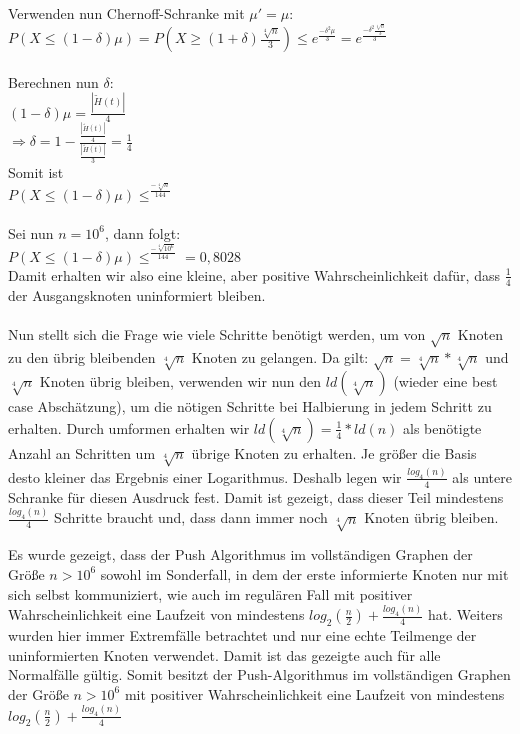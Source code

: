\documentclass[12pt,a4paper]{report}
\begin{document}
\begin{itemize}
	Verwenden nun Chernoff-Schranke mit $\mu' = \mu$:\\
	$P(X\le(1-\delta)\mu)=P(X\ge(1+\delta)\frac{\sqrt[4]{n}}{3})\le e^{\frac{-\delta^2 \mu}{3}}=e^{\frac{-\delta^2 \frac{\sqrt[4]{n}}{3}}{3}}$\\
	\\
	Berechnen nun $\delta$:\\
	$(1-\delta)\mu = \frac{|\tilde{H}(t)|}{4}$\\
	$\Rightarrow \delta =1-\frac{\frac{|\tilde{H}(t)|}{4}}{\frac{|\tilde{H}(t)|}{3}} = \frac{1}{4}$\\
	Somit ist\\
	$P(X\le(1-\delta)\mu)\le^{\frac{-\sqrt[4]{n}}{144}}$\\
	\\
	Sei nun $n=10^6$, dann folgt:\\
	$P(X\le(1-\delta)\mu)\le^{\frac{-\sqrt[4]{10^6}}{144}} = 0,8028$\\
	Damit erhalten wir also eine kleine, aber positive Wahrscheinlichkeit dafür, dass $\frac{1}{4}$ der Ausgangsknoten uninformiert bleiben. \\
	\\
	Nun stellt sich die Frage wie viele Schritte benötigt werden, um von $\sqrt{n}$ Knoten zu den übrig bleibenden
	$\sqrt[4]{n}$ Knoten zu gelangen.
	Da gilt: $\sqrt{n} = \sqrt[4]{n} * \sqrt[4]{n}$ und $\sqrt[4]{n}$ Knoten übrig bleiben, verwenden wir nun den $ld(\sqrt[4]{n})$ (wieder eine best case Abschätzung),
	um die nötigen Schritte bei Halbierung in jedem Schritt zu erhalten. Durch umformen erhalten wir $ld(\sqrt[4]{n}) = \frac{1}{4}*ld(n)$
	als benötigte Anzahl an Schritten um $\sqrt[4]{n}$ übrige Knoten zu erhalten. Je größer die Basis desto kleiner das Ergebnis einer Logarithmus.
	Deshalb legen wir $\frac{log_4(n)}{4}$ als untere Schranke für diesen Ausdruck fest. Damit ist gezeigt, dass dieser Teil mindestens $\frac{log_4(n)}{4}$ Schritte braucht und, dass dann immer noch $\sqrt[4]{n}$ Knoten übrig bleiben.


	\end{itemize}

Es wurde gezeigt, dass der Push Algorithmus im vollständigen Graphen der Größe $n > 10^6$ sowohl im Sonderfall, in dem der erste informierte Knoten nur mit sich selbst kommuniziert,
wie auch im regulären Fall mit positiver Wahrscheinlichkeit eine Laufzeit von mindestens $log_2(\frac{n}{2})+\frac{log_4(n)}{4}$ hat.
Weiters wurden hier immer Extremfälle betrachtet und nur eine echte Teilmenge der uninformierten Knoten verwendet.
Damit ist das gezeigte auch für alle Normalfälle gültig.
Somit besitzt der Push-Algorithmus im vollständigen Graphen der Größe $n>10^6$ mit positiver Wahrscheinlichkeit eine Laufzeit von mindestens $log_2(\frac{n}{2})+\frac{log_4(n)}{4}$
\end{document}
